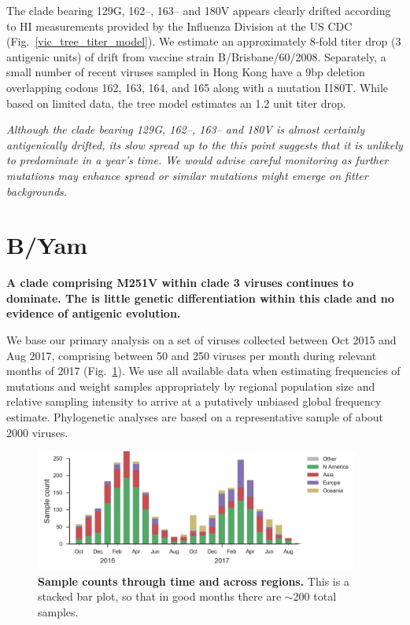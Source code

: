 \documentclass[11pt,oneside,letterpaper]{article}
\newcommand{\FIG}[1]{Fig.~\ref{#1}}
\begin{document}
The clade bearing 129G, 162--, 163-- and 180V appears clearly drifted
according to HI measurements provided by the Influenza Division at the
US CDC (\FIG{vic_tree_titer_model}). We estimate an approximately 8-fold titer drop (3 antigenic
units) of drift from vaccine strain B/Brisbane/60/2008. Separately, a
small number of recent viruses sampled in Hong Kong have a 9bp deletion
overlapping codons 162, 163, 164, and 165 along with a mutation I180T.
While based on limited data, the tree model estimates an 1.2 unit titer
drop.



\emph{Although the clade bearing 129G, 162--, 163-- and 180V is almost
certainly antigenically drifted, its slow spread up to the this point
suggests that it is unlikely to predominate in a year's time. We would
advise careful monitoring as further mutations may enhance spread or
similar mutations might emerge on fitter backgrounds.}

\clearpage
\section*{B/Yam}

\textbf{A clade comprising M251V within clade 3 viruses continues to
dominate. The is little genetic differentiation within this clade and no
evidence of antigenic evolution.}

We base our primary analysis on a set of viruses collected between Oct
2015 and Aug 2017, comprising between 50 and 250 viruses per month
during relevant months of 2017 (\FIG{yam_counts}). We use all available data when
estimating frequencies of mutations and weight samples appropriately by
regional population size and relative sampling intensity to arrive at a
putatively unbiased global frequency estimate. Phylogenetic analyses are
based on a representative sample of about 2000 viruses.

\begin{figure}[H]
  \centering
  \includegraphics[width=0.95\textwidth]{../figures/sep-2017/yam_counts.png}
  \caption{\textbf{Sample counts through time and across regions.}
  This is a stacked bar plot, so that in good months there are $\sim$200 total samples.
  }
  \label{yam_counts}
\end{figure}
\end{document}
